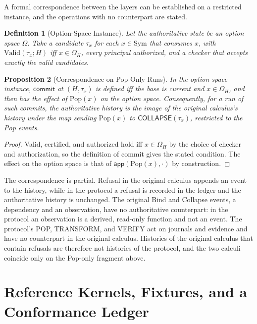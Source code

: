 \documentclass[12pt,oneside,openany]{book}
\theoremstyle{spherepop}
\newtheorem{definition}{Definition}[chapter]
\newtheorem{proposition}[definition]{Proposition}
\theoremstyle{remarkstyle}
\newcommand{\Pop}{\mathrm{Pop}}
\newcommand{\Sym}{\mathrm{Sym}}
\begin{document}
A formal correspondence between the layers can be established on a restricted instance, and the operations with no counterpart are stated.

\begin{definition}[Option-Space Instance]
Let the authoritative state be an option space $\Omega$. Take a candidate $\tau_x$ for each $x\in\Sym$ that consumes $x$, with $\mathrm{Valid}(\tau_x;H)$ iff $x\in\Omega_H$, every principal authorized, and a checker that accepts exactly the valid candidates.
\end{definition}

\begin{proposition}[Correspondence on Pop-Only Runs]
In the option-space instance, $\mathsf{commit}$ at $(H,\tau_x)$ is defined iff the base is current and $x\in\Omega_H$, and then has the effect of $\Pop(x)$ on the option space. Consequently, for a run of such commits, the authoritative history is the image of the original calculus's history under the map sending $\Pop(x)$ to $\mathsf{COLLAPSE}(\tau_x)$, restricted to the Pop events.
\end{proposition}

\begin{proof}
Valid, certified, and authorized hold iff $x\in\Omega_H$ by the choice of checker and authorization, so the definition of commit gives the stated condition. The effect on the option space is that of $\mathsf{app}(\Pop(x),\cdot)$ by construction.
\end{proof}

The correspondence is partial. Refusal in the original calculus appends an event to the history, while in the protocol a refusal is recorded in the ledger and the authoritative history is unchanged. The original Bind and Collapse events, a dependency and an observation, have no authoritative counterpart: in the protocol an observation is a derived, read-only function and not an event. The protocol's POP, TRANSFORM, and VERIFY act on journals and evidence and have no counterpart in the original calculus. Histories of the original calculus that contain refusals are therefore not histories of the protocol, and the two calculi coincide only on the Pop-only fragment above.

\chapter{Reference Kernels, Fixtures, and a Conformance Ledger}
\label{ch:kernels}
\end{document}
